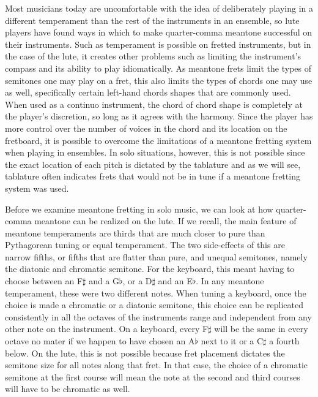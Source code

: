 Most musicians today are uncomfortable with the idea of deliberately playing in a
different temperament than the rest of the instruments in an ensemble, so lute players
have found ways in which to make quarter-comma meantone successful on their instruments.
Such as temperament is possible on fretted instruments, but in the case of the lute, it
creates other problems such as limiting the instrument's compass and its ability to play
idiomatically.  As meantone frets limit the types of semitones one may play on a fret,
this also limits the types of chords one may use as well, specifically certain left-hand
chords shapes that are commonly used.  When used as a continuo instrument, the chord of
chord shape is completely at the player's discretion, so long as it agrees with the
harmony.  Since the player has more control over the number of voices in the chord and its
location on the fretboard, it is possible to overcome the limitations of a meantone
fretting system when playing in ensembles.  In solo situations, however, this is not
possible since the exact location of each pitch is dictated by the tablature and as we
will see, tablature often indicates frets that would not be in tune if a meantone fretting
system was used.

Before we examine meantone fretting in solo music, we can look at how quarter-comma
meantone can be realized on the lute.  If we recall, the main feature of meantone
temperaments are thirds that are much closer to pure than Pythagorean tuning or equal
temperament.  The two side-effects of this are narrow fifths, or fifths that are flatter
than pure, and unequal semitones, namely the diatonic and chromatic semitone.  For the
keyboard, this meant having to choose between an F$\sharp$ and a G$\flat$, or a D$\sharp$
and an E$\flat$.  In any meantone temperament, these were two different notes.  When
tuning a keyboard, once the choice is made a chromatic or a diatonic semitone, this choice
can be replicated consistently in all the octaves of the instruments range and independent
from any other note on the instrument. On a keyboard, every F$\sharp$ will be the same in
every octave no mater if we happen to have chosen an A$\flat$ next to it or a C$\sharp$ a
fourth below.  On the lute, this is not possible because fret placement dictates the
semitone size for all notes along that fret.  In that case, the choice of a chromatic
semitone at the first course will mean the note at the second and third courses will have
to be chromatic as well.

